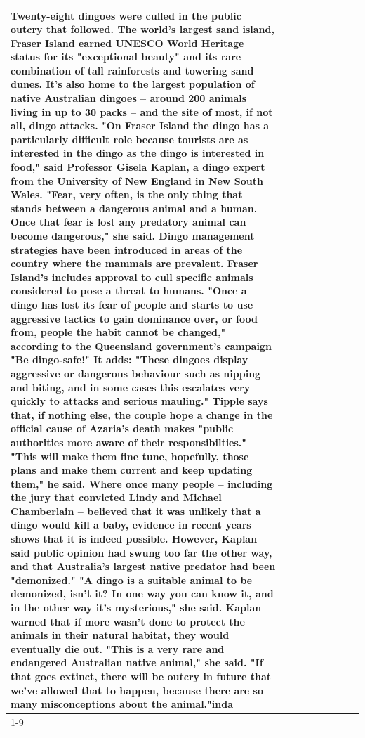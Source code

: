 \begin{table}[H]
\begin{tabular}{lllrlllll}
Twenty-eight dingoes were culled in the public outcry that followed. The world's largest sand island, Fraser Island earned UNESCO World Heritage status for its "exceptional beauty" and its rare combination of tall rainforests and towering sand dunes. It's also home to the largest population of native Australian dingoes -- around 200 animals living in up to 30 packs -- and the site of most, if not all, dingo attacks. "On Fraser Island the dingo has a particularly difficult role because tourists are as interested in the dingo as the dingo is interested in food," said Professor Gisela Kaplan, a dingo expert from the University of New England in New South Wales. "Fear, very often, is the only thing that stands between a dangerous animal and a human. Once that fear is lost any predatory animal can become dangerous," she said. Dingo management strategies have been introduced in areas of the country where the mammals are prevalent. Fraser Island's includes approval to cull specific animals considered to pose a threat to humans. "Once a dingo has lost its fear of people and starts to use aggressive tactics to gain dominance over, or food from, people the habit cannot be changed," according to the Queensland government's campaign "Be dingo-safe!" It adds: "These dingoes display aggressive or dangerous behaviour such as nipping and biting, and in some cases this escalates very quickly to attacks and serious mauling." Tipple says that, if nothing else, the couple hope a change in the official cause of Azaria's death makes "public authorities more aware of their responsibilties." "This will make them fine tune, hopefully, those plans and make them current and keep updating them," he said. Where once many people -- including the jury that convicted Lindy and Michael Chamberlain -- believed that it was unlikely that a dingo would kill a baby, evidence in recent years shows that it is indeed possible. However, Kaplan said public opinion had swung too far the other way, and that Australia's largest native predator had been "demonized." "A dingo is a suitable animal to be demonized, isn't it? In one way you can know it, and in the other way it's mysterious," she said. Kaplan warned that if more wasn't done to protect the animals in their natural habitat, they would eventually die out. "This is a very rare and endangered Australian native animal," she said. "If that goes extinct, there will be outcry in future that we've allowed that to happen, because there are so many misconceptions about the animal."inda \\
\cline{1-9}

\end{tabular}
\end{table}
